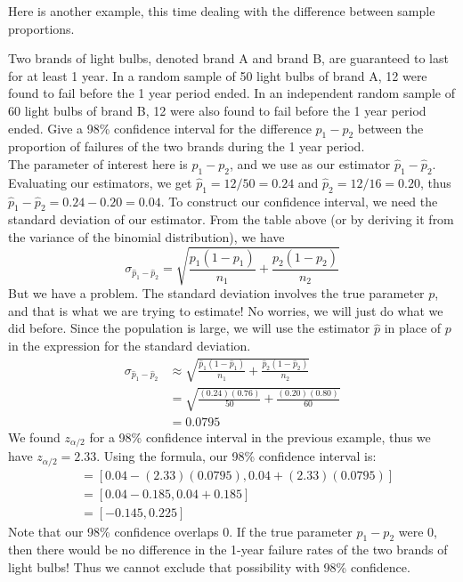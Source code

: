 \documentclass[notes.tex]{subfiles}
\begin{document}
Here is another example, this time dealing with the difference between sample proportions.

\begin{example}Two brands of light bulbs, denoted brand A and brand B, are guaranteed to last for at least 1 year. In a random sample of 50 light bulbs of brand A, 12 were found to fail before the 1 year period ended. In an independent random sample of 60 light bulbs of brand B, 12 were also found to fail before the 1 year period ended. Give a 98\% confidence interval for the difference $p_1 - p_2$ between the proportion of failures of the two brands during the 1 year period.\\

The parameter of interest here is $p_1 - p_2$, and we use as our estimator $\hat{p}_1 - \hat{p}_2$. Evaluating our estimators, we get $\hat{p}_1 = 12/50 = 0.24$ and $\hat{p}_2 = 12/16 = 0.20$, thus $\hat{p}_1 - \hat{p}_2 = 0.24 - 0.20 = 0.04$. To construct our confidence interval, we need the standard deviation of our estimator. From the table above (or by deriving it from the variance of the binomial distribution), we have
\[
\sigma_{\hat{p}_1 - \hat{p}_2} = \sqrt{\frac{p_1(1-p_1)}{n_1} +\frac{p_2(1-p_2)}{n_2} }
\]
But we have a problem. The standard deviation involves the true parameter $p$, and that is what we are trying to estimate! No worries, we will just do what we did before. Since the population is large, we will use the estimator $\hat{p}$ in place of $p$ in the expression for the standard deviation.
\begin{align*}
\sigma_{\hat{p}_1 - \hat{p}_2} &\approx \sqrt{\frac{\hat{p}_1(1-\hat{p}_1)}{n_1} +\frac{\hat{p}_2(1-\hat{p}_2)}{n_2} } \\
&= \sqrt{\frac{(0.24)(0.76)}{50} +\frac{(0.20)(0.80)}{60} }\\
&= 0.0795 
\end{align*}
We found $z_{\alpha/2}$ for a 98\% confidence interval in the previous example, thus we have $z_{\alpha/2} = 2.33$. Using the formula, our 98\% confidence interval is:
\begin{align*}
[ (\hat{p}_1 - \hat{p}_2) - z_{\alpha/2} \sigma_{\hat{p}_1 - \hat{p}_2}, (\hat{p}_1 - \hat{p}_2) + z_{\alpha/2} \sigma_{\hat{p}_1 - \hat{p}_2} ] &= [ 0.04 - (2.33)(0.0795), 0.04 + (2.33)(0.0795)] \\
&= [ 0.04 - 0.185, 0.04 + 0.185] \\
&= [-0.145, 0.225]
\end{align*}
Note that our 98\% confidence overlaps 0. If the true parameter $p_1 - p_2$ were 0, then there would be no difference in the 1-year failure rates of the two brands of light bulbs! Thus we cannot exclude that possibility with 98\% confidence.
\end{example}
\end{document}
